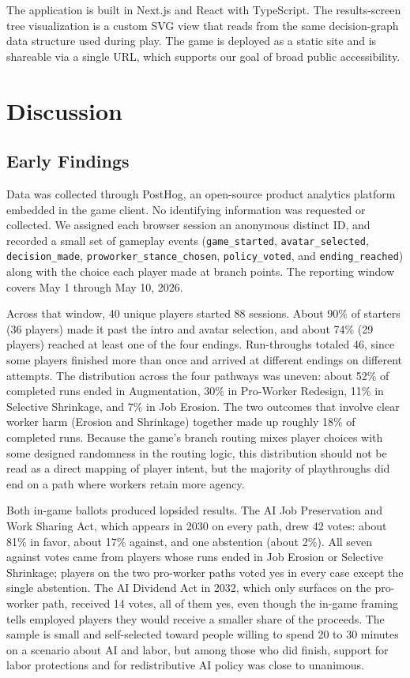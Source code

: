 \documentclass[sigconf,authordraft]{acmart}
\begin{document}
The application is built in Next.js and React with TypeScript. The results-screen tree visualization is a custom SVG view that reads from the same decision-graph data structure used during play. The game is deployed as a static site and is shareable via a single URL, which supports our goal of broad public accessibility.

\section{Discussion}

\subsection{Early Findings}

Data was collected through PostHog, an open-source product analytics platform embedded in the game client. No identifying information was requested or collected. We assigned each browser session an anonymous distinct ID, and recorded a small set of gameplay events (\texttt{game\_started}, \texttt{avatar\_selected}, \texttt{decision\_made}, \texttt{proworker\_stance\_chosen}, \texttt{policy\_voted}, and \texttt{ending\_reached}) along with the choice each player made at branch points. The reporting window covers May 1 through May 10, 2026.

Across that window, 40 unique players started 88 sessions. About 90\% of starters (36 players) made it past the intro and avatar selection, and about 74\% (29 players) reached at least one of the four endings. Run-throughs totaled 46, since some players finished more than once and arrived at different endings on different attempts. The distribution across the four pathways was uneven: about 52\% of completed runs ended in Augmentation, 30\% in Pro-Worker Redesign, 11\% in Selective Shrinkage, and 7\% in Job Erosion. The two outcomes that involve clear worker harm (Erosion and Shrinkage) together made up roughly 18\% of completed runs. Because the game's branch routing mixes player choices with some designed randomness in the routing logic, this distribution should not be read as a direct mapping of player intent, but the majority of playthroughs did end on a path where workers retain more agency.

Both in-game ballots produced lopsided results. The AI Job Preservation and Work Sharing Act, which appears in 2030 on every path, drew 42 votes: about 81\% in favor, about 17\% against, and one abstention (about 2\%). All seven against votes came from players whose runs ended in Job Erosion or Selective Shrinkage; players on the two pro-worker paths voted yes in every case except the single abstention. The AI Dividend Act in 2032, which only surfaces on the pro-worker path, received 14 votes, all of them yes, even though the in-game framing tells employed players they would receive a smaller share of the proceeds. The sample is small and self-selected toward people willing to spend 20 to 30 minutes on a scenario about AI and labor, but among those who did finish, support for labor protections and for redistributive AI policy was close to unanimous.
\end{document}
